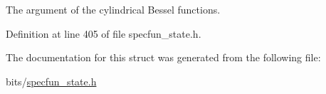 The argument of the cylindrical Bessel functions. 



Definition at line 405 of file specfun\+\_\+state.\+h.



The documentation for this struct was generated from the following file\+:\begin{DoxyCompactItemize}
\item 
bits/\hyperlink{specfun__state_8h}{specfun\+\_\+state.\+h}\end{DoxyCompactItemize}
